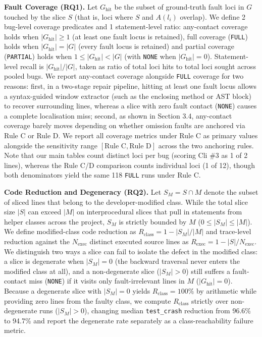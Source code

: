 \documentclass[sigconf,nonacm]{acmart}
\begin{document}
\textbf{Fault Coverage (RQ1).} Let $G_{\text{hit}}$ be the subset of ground-truth fault loci in $G$ touched by the slice $S$ (that is, loci where $S$ and $A(l_i)$ overlap). We define 2 bug-level coverage predicates and 1 statement-level ratio: any-contact coverage holds when $|G_{\text{hit}}| \ge 1$ (at least one fault locus is retained), full coverage (\texttt{FULL}) holds when $|G_{\text{hit}}| = |G|$ (every fault locus is retained) and partial coverage (\texttt{PARTIAL}) holds when $1 \le |G_{\text{hit}}| < |G|$ (with \texttt{NONE} when $|G_{\text{hit}}| = 0$). Statement-level recall is $|G_{\text{hit}}| / |G|$, taken as ratio of total loci hits to total loci sought across pooled bugs. We report any-contact coverage alongside \texttt{FULL} coverage for two reasons: first, in a two-stage repair pipeline, hitting at least one fault locus allows a syntax-guided window extractor (such as the enclosing method or AST block) to recover surrounding lines, whereas a slice with zero fault contact (\texttt{NONE}) causes a complete localisation miss; second, as shown in Section 3.4, any-contact coverage barely moves depending on whether omission faults are anchored via Rule C or Rule D. We report all coverage metrics under Rule C as primary values alongside the sensitivity range $[\text{Rule C}, \text{Rule D}]$ across the two anchoring rules. Note that our main tables count distinct loci per bug (scoring Cli \#3 as 1 of 2 lines), whereas the Rule C/D comparison counts individual loci (1 of 12), though both denominators yield the same 118 \texttt{FULL} runs under Rule C.

\textbf{Code Reduction and Degeneracy (RQ2).} Let $S_M = S \cap M$ denote the subset of sliced lines that belong to the developer-modified class. While the total slice size $|S|$ can exceed $|M|$ on interprocedural slices that pull in statements from helper classes across the project, $S_M$ is strictly bounded by $M$ ($0 \le |S_M| \le |M|$). We define modified-class code reduction as $R_{\text{class}} = 1 - |S_M| / |M|$ and trace-level reduction against the $N_{\text{exec}}$ distinct executed source lines as $R_{\text{exec}} = 1 - |S| / N_{\text{exec}}$. We distinguish two ways a slice can fail to isolate the defect in the modified class: a slice is degenerate when $|S_M| = 0$ (the backward traversal never enters the modified class at all), and a non-degenerate slice ($|S_M| > 0$) still suffers a fault-contact miss (\texttt{NONE}) if it visits only fault-irrelevant lines in $M$ ($|G_{\text{hit}}| = 0$). Because a degenerate slice with $|S_M| = 0$ yields $R_{\text{class}} = 100\%$ by arithmetic while providing zero lines from the faulty class, we compute $R_{\text{class}}$ strictly over non-degenerate runs ($|S_M| > 0$), changing median \texttt{test\_crash} reduction from 96.6\% to 94.7\% and report the degenerate rate separately as a class-reachability failure metric.
\end{document}
